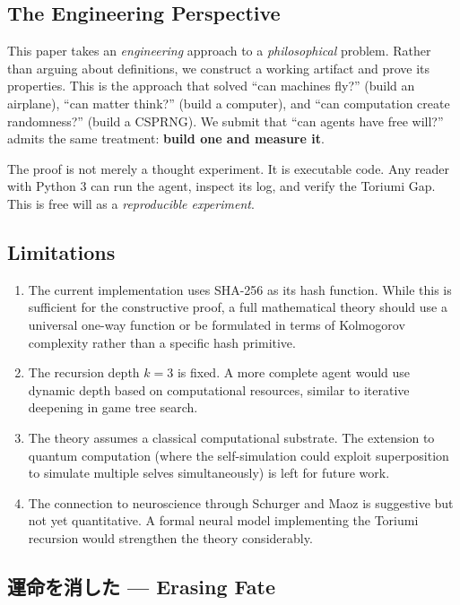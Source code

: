 \documentclass[12pt,a4paper]{article}
\theoremstyle{definition}
\theoremstyle{remark}
\begin{document}
\subsection{The Engineering Perspective}

This paper takes an \emph{engineering} approach to a \emph{philosophical}
problem. Rather than arguing about definitions, we construct a working
artifact and prove its properties. This is the approach that solved
``can machines fly?'' (build an airplane), ``can matter think?'' (build a
computer), and ``can computation create randomness?'' (build a CSPRNG).
We submit that ``can agents have free will?'' admits the same treatment:
\textbf{build one and measure it}.

The proof is not merely a thought experiment. It is executable code. Any
reader with Python 3 can run the agent, inspect its log, and verify the
Toriumi Gap. This is free will as a \emph{reproducible experiment}.

\subsection{Limitations}

\begin{enumerate}[itemsep=0pt]
\item The current implementation uses SHA-256 as its hash function. While this
  is sufficient for the constructive proof, a full mathematical theory should
  use a universal one-way function or be formulated in terms of Kolmogorov
  complexity rather than a specific hash primitive.

\item The recursion depth $k=3$ is fixed. A more complete agent would use
  dynamic depth based on computational resources, similar to iterative
  deepening in game tree search.

\item The theory assumes a classical computational substrate. The extension
  to quantum computation (where the self-simulation could exploit superposition
  to simulate multiple selves simultaneously) is left for future work.

\item The connection to neuroscience through Schurger and Maoz is suggestive
  but not yet quantitative. A formal neural model implementing the Toriumi
  recursion would strengthen the theory considerably.
\end{enumerate}

\subsection{運命を消した --- Erasing Fate}
\end{document}
